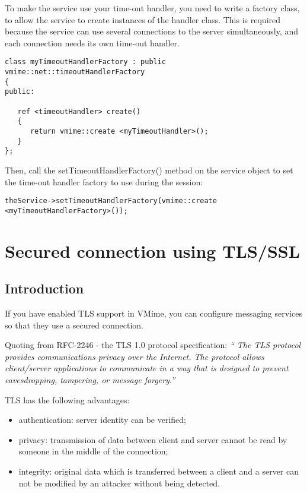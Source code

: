 To make the service use your time-out handler, you need to write a factory
class, to allow the service to create instances of the handler class. This
is required because the service can use several connections to the server
simultaneously, and each connection needs its own time-out handler.

\begin{lstlisting}
class myTimeoutHandlerFactory : public vmime::net::timeoutHandlerFactory
{
public:

   ref <timeoutHandler> create()
   {
      return vmime::create <myTimeoutHandler>();
   }
};
\end{lstlisting}

Then, call the {\vcode setTimeoutHandlerFactory()} method on the service object
to set the time-out handler factory to use during the session:

\begin{lstlisting}
theService->setTimeoutHandlerFactory(vmime::create <myTimeoutHandlerFactory>());
\end{lstlisting}


\newpage
\section{Secured connection using TLS/SSL}

\subsection{Introduction} %

If you have enabled TLS support in VMime, you can configure messaging services
so that they use a secured connection.

Quoting from RFC-2246 - the TLS 1.0 protocol specification: \emph{`` The TLS
protocol provides communications privacy over the Internet. The protocol
allows client/server applications to communicate in a way that is designed
to prevent eavesdropping, tampering, or message forgery.''}

TLS has the following advantages:

\begin{itemize}
\item authentication: server identity can be verified;
\item privacy: transmission of data between client and server cannot be read
by someone in the middle of the connection;
\item integrity: original data which is transferred between a client and a
server can not be modified by an attacker without being detected.
\end{itemize}

